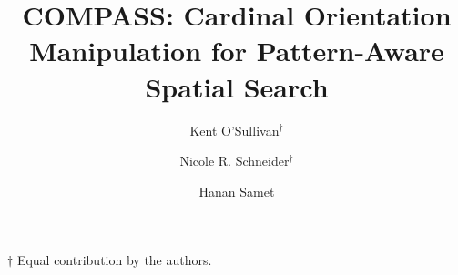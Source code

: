 \documentclass[sigconf]{acmart}
\begin{document}


\graphicspath{ {figures/}{auto_commit_fig/}{auto_fig/} }

\newcommand{\latexfile}[1]{}

\newcommand{\pinaforecomment}[4]{\colorbox{#1}{\textcolor{#4}{\parbox{.8\linewidth}{#2: #3}}}}
\newcommand{\osullikomment}[1]{\pinaforecomment{green}{Kent}{#1}{black}}
\newcommand{\nrscomment}[1]{\pinaforecomment{violet}{Nicole}{#1}{white}}

\newcommand\blankpage{%
    \null
    \thispagestyle{empty}%
    \addtocounter{page}{-1}%
    \newpage}



\title{COMPASS: Cardinal Orientation Manipulation for Pattern-Aware Spatial Search\\}

\author{Kent O'Sullivan{$^\dagger$}}

\author{Nicole R. Schneider$^\dagger$}

\author{Hanan Samet}



\begin{abstract}
\latexfile{00_Abstract.tex}
\end{abstract}

\maketitle
$\dagger$ Equal contribution by the authors. 

\latexfile{10_Introduction.tex}
\latexfile{20_Related.tex}
\latexfile{30_Concept_Mapping.tex}
\latexfile{40_Proximity_Search.tex}
\latexfile{50_Object_Location_Search.tex}
\latexfile{60_Object_Object_Search.tex}
\latexfile{70_Results.tex}
\latexfile{80_Conclusion.tex}


 \label{bibliography}


\end{document}
